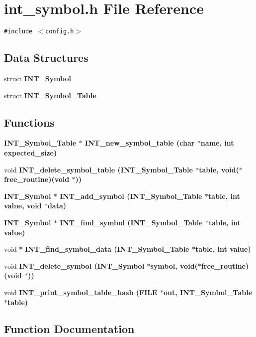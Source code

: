 \section{int\_\-symbol.h File Reference}
\label{int__symbol_8h}
{\tt \#include $<$config.h$>$}\par
\subsection*{Data Structures}
\begin{CompactItemize}
\item 
struct \bf{INT\_\-Symbol}
\item 
struct \bf{INT\_\-Symbol\_\-Table}
\end{CompactItemize}
\subsection*{Functions}
\begin{CompactItemize}
\item 
\bf{INT\_\-Symbol\_\-Table} $\ast$ \bf{INT\_\-new\_\-symbol\_\-table} (char $\ast$\bf{name}, int expected\_\-size)
\item 
void \bf{INT\_\-delete\_\-symbol\_\-table} (\bf{INT\_\-Symbol\_\-Table} $\ast$table, void($\ast$free\_\-routine)(void $\ast$))
\item 
\bf{INT\_\-Symbol} $\ast$ \bf{INT\_\-add\_\-symbol} (\bf{INT\_\-Symbol\_\-Table} $\ast$table, int value, void $\ast$data)
\item 
\bf{INT\_\-Symbol} $\ast$ \bf{INT\_\-find\_\-symbol} (\bf{INT\_\-Symbol\_\-Table} $\ast$table, int value)
\item 
void $\ast$ \bf{INT\_\-find\_\-symbol\_\-data} (\bf{INT\_\-Symbol\_\-Table} $\ast$table, int value)
\item 
void \bf{INT\_\-delete\_\-symbol} (\bf{INT\_\-Symbol} $\ast$symbol, void($\ast$free\_\-routine)(void $\ast$))
\item 
void \bf{INT\_\-print\_\-symbol\_\-table\_\-hash} (FILE $\ast$out, \bf{INT\_\-Symbol\_\-Table} $\ast$table)
\end{CompactItemize}


\subsection{Function Documentation}
